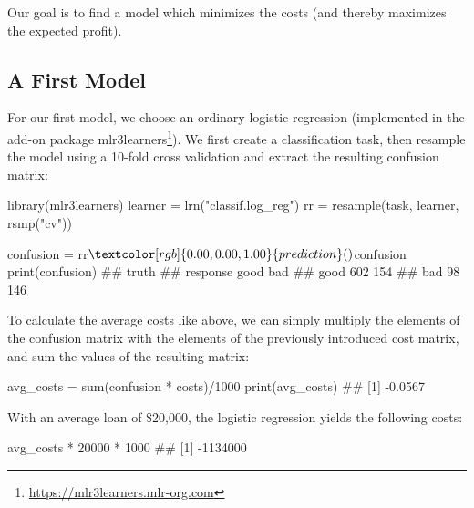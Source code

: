\documentclass[12pt,]{scrbook}
\newenvironment{Shaded}{}{}
\newcommand{\DecValTok}[1]{#1}
\newcommand{\KeywordTok}[1]{\textcolor[rgb]{0.00,0.00,1.00}{#1}}
\newcommand{\NormalTok}[1]{#1}
\newcommand{\OperatorTok}[1]{#1}
\newcommand{\StringTok}[1]{\textcolor[rgb]{0.00,0.50,0.50}{#1}}
\renewcommand{\href}[2]{#2\footnote{\url{#1}}}
\begin{document}
Our goal is to find a model which minimizes the costs (and thereby maximizes the expected profit).

\hypertarget{a-first-model}{%
\subsection{A First Model}\label{a-first-model}}

For our first model, we choose an ordinary logistic regression (implemented in the add-on package \href{https://mlr3learners.mlr-org.com}{mlr3learners}).
We first create a classification task, then resample the model using a 10-fold cross validation and extract the resulting confusion matrix:

\begin{Shaded}
\begin{Highlighting}[]
\KeywordTok{library}\NormalTok{(mlr3learners)}
\NormalTok{learner =}\StringTok{ }\KeywordTok{lrn}\NormalTok{(}\StringTok{"classif.log_reg"}\NormalTok{)}
\NormalTok{rr =}\StringTok{ }\KeywordTok{resample}\NormalTok{(task, learner, }\KeywordTok{rsmp}\NormalTok{(}\StringTok{"cv"}\NormalTok{))}

\NormalTok{confusion =}\StringTok{ }\NormalTok{rr}\OperatorTok{$}\KeywordTok{prediction}\NormalTok{()}\OperatorTok{$}\NormalTok{confusion}
\KeywordTok{print}\NormalTok{(confusion)}
\NormalTok{##         truth}
\NormalTok{## response good bad}
\NormalTok{##     good  602 154}
\NormalTok{##     bad    98 146}
\end{Highlighting}
\end{Shaded}

To calculate the average costs like above, we can simply multiply the elements of the confusion matrix with the elements of the previously introduced cost matrix, and sum the values of the resulting matrix:

\begin{Shaded}
\begin{Highlighting}[]
\NormalTok{avg_costs =}\StringTok{ }\KeywordTok{sum}\NormalTok{(confusion }\OperatorTok{*}\StringTok{ }\NormalTok{costs)}\OperatorTok{/}\DecValTok{1000}
\KeywordTok{print}\NormalTok{(avg_costs)}
\NormalTok{## [1] -0.0567}
\end{Highlighting}
\end{Shaded}

With an average loan of \$20,000, the logistic regression yields the following costs:

\begin{Shaded}
\begin{Highlighting}[]
\NormalTok{avg_costs }\OperatorTok{*}\StringTok{ }\DecValTok{20000} \OperatorTok{*}\StringTok{ }\DecValTok{1000}
\NormalTok{## [1] -1134000}
\end{Highlighting}
\end{Shaded}
\end{document}
